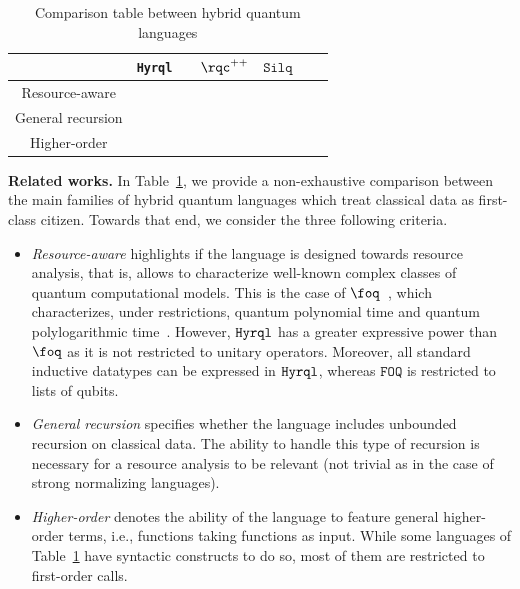 \documentclass[10pt,a4paper]{article}
\newcommand{\ie}{\text{i.e., }}
\newcommand{\hyrql}{{{\tt{Hyrql}}}}
\begin{document}
\begingroup
\newcommand{\cmark}{\ding{51}}
\newcommand{\xmark}{\ding{55}}
\renewcommand{\arraystretch}{1.2}
\setlength\tabcolsep{3pt}
\begin{table}[!h]
  \begin{center}
      \begin{tabular}{c | c | c | c | c | c | c }
        & \hyrql{} &\foq{} \cite{HPS23} & $\rqc^{++}$ \cite{YZ24} &
        $\mathtt{Silq}$ \cite{Silq20} & \qunity{} \cite{Qunity23} & \dlpz{}
        \cite{DLPZ25} \\ \hline 
        Resource-aware & \cmark & \cmark & \xmark & \xmark & \xmark & \xmark \\
        \hline
        General recursion & \cmark & \xmark & \cmark & \xmark & \xmark & \xmark
        \\
        Higher-order & \cmark & \xmark & \xmark & \xmark & \xmark & \xmark
      \end{tabular}
  \end{center}
  \caption{Comparison table between hybrid quantum languages }
  \label{tab:related}
  \vspace*{-0.5cm}
\end{table}
\endgroup

\medskip
\noindent
\textbf{Related works. }
In Table~\ref{tab:related}, we provide a non-exhaustive comparison between the
main families of hybrid quantum languages which treat classical data as
first-class citizen.
Towards that end, we consider the three following criteria.
\begin{itemize} 
  \item \textit{Resource-aware} highlights if the language is designed towards
    resource analysis, that is, allows to characterize well-known complex
    classes of quantum computational models. This is the case of
    $\foq$~\cite{HPS23,HPS25}, which characterizes, under restrictions, quantum
    polynomial time and quantum polylogarithmic time~\cite{FHPS25}.
    However, $\hyrql$ has a greater expressive power than $\foq$  as it is not
    restricted to unitary operators. Moreover, all standard inductive datatypes
    can be expressed in $\hyrql$, whereas $\texttt{FOQ}$ is restricted to lists
    of qubits. 

  \item \textit{General recursion} specifies whether the language includes
    unbounded recursion on classical data. The ability to handle this type of recursion is
    necessary for a resource analysis to be relevant (\ie not trivial as in
    the case of strong normalizing languages). 

  \item \textit{Higher-order} denotes the ability of the language to
    feature general higher-order terms, i.e., functions taking functions as
    input. While some languages of Table~\ref{tab:related} have syntactic
    constructs to do so, most of them are restricted to first-order calls. 
\end{itemize}
\end{document}
